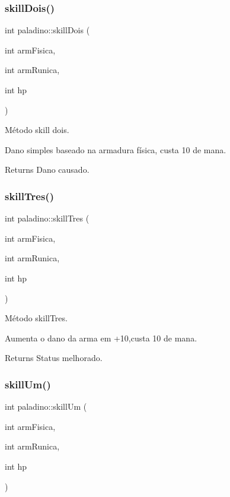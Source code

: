 \subsubsection{\texorpdfstring{skill\+Dois()}{skillDois()}}
{\footnotesize\ttfamily int paladino\+::skill\+Dois (\begin{DoxyParamCaption}\item[{int}]{arm\+Fisica,  }\item[{int}]{arm\+Runica,  }\item[{int}]{hp }\end{DoxyParamCaption})}



Método skill dois. 

Dano simples baseado na armadura física, custa 10 de mana. \begin{DoxyReturn}{Returns}
Dano causado. 
\end{DoxyReturn}
\mbox{\label{classpaladino_acd4e68058d2504c07989af88ace6d57b}} 
\subsubsection{\texorpdfstring{skill\+Tres()}{skillTres()}}
{\footnotesize\ttfamily int paladino\+::skill\+Tres (\begin{DoxyParamCaption}\item[{int}]{arm\+Fisica,  }\item[{int}]{arm\+Runica,  }\item[{int}]{hp }\end{DoxyParamCaption})}



Método skill\+Tres. 

Aumenta o dano da arma em +10,custa 10 de mana. \begin{DoxyReturn}{Returns}
Status melhorado. 
\end{DoxyReturn}
\mbox{\label{classpaladino_aaf70250e226146bab3bb421b253483d5}} 
\subsubsection{\texorpdfstring{skill\+Um()}{skillUm()}}
{\footnotesize\ttfamily int paladino\+::skill\+Um (\begin{DoxyParamCaption}\item[{int}]{arm\+Fisica,  }\item[{int}]{arm\+Runica,  }\item[{int}]{hp }\end{DoxyParamCaption})}



